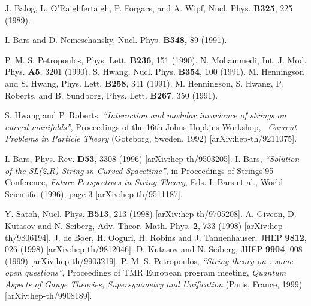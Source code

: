 \documentclass[a4paper,12pt]{article}
\begin{document}
\begin{thebibliography}{99}
  J. Balog, L. O'Raighfertaigh, P. Forgacs, and A. Wipf, Nucl.
Phys. \textbf{B325}, 225 (1989).

  I. Bars and D. Nemeschansky, Nucl. Phys. \textbf{B348,} 89
(1991).

  P. M. S. Petropoulos, Phys. Lett. \textbf{B236}, 151
(1990). \newline
N. Mohammedi, Int. J. Mod. Phys. \textbf{A5}, 3201 (1990). \newline
S. Hwang, Nucl. Phys. \textbf{B354}, 100 (1991). \newline
M. Henningson and S. Hwang, Phys. Lett. \textbf{B258}, 341 (1991). \newline
M. Henningson, S. Hwang, P. Roberts, and B. Sundborg, Phys. Lett. \textbf{%
B267}, 350 (1991).

  S. Hwang and P. Roberts, \textit{``Interaction and
modular invariance of strings on curved manifolds''}, Proceedings of the
16th Johns Hopkins Workshop, \textit{\ Current Problems in Particle Theory}
(Goteborg, Sweden, 1992) [arXiv:hep-th/9211075].

  I. Bars, Phys. Rev. \textbf{D53}, 3308 (1996)
[arXiv:hep-th/9503205]. \newline
I. Bars, \textit{``Solution of the SL(2,R) String in Curved Spacetime''}, in
Proceedings of Strings'95 Conference, \textit{Future Perspectives in String
Theory}, Eds. I. Bars et al., World Scientific (1996), page 3
[arXiv:hep-th/9511187].

  Y. Satoh, Nucl. Phys. \textbf{B513}, 213 (1998)
[arXiv:hep-th/9705208]. \newline
A. Giveon, D. Kutasov and N. Seiberg,
Adv. Theor. Math. Phys. \textbf{2}, 733 (1998) [arXiv:hep-th/9806194].
\newline
J. de Boer, H. Ooguri, H. Robins and J. Tannenhauser,
JHEP \textbf{9812}, 026 (1998) [arXiv:hep-th/9812046]. \newline
D. Kutasov and N. Seiberg, %
JHEP \textbf{9904}, 008 (1999) [arXiv:hep-th/9903219]. \newline
P. M. S. Petropoulos, \textit{``String theory on \coordHE{}: some open
questions''}, Proceedings of TMR European program meeting, \textit{Quantum
Aspects of Gauge Theories, Supersymmetry and Unification} (Paris, France,
1999) [arXiv:hep-th/9908189].


\end{thebibliography}
\end{document}
